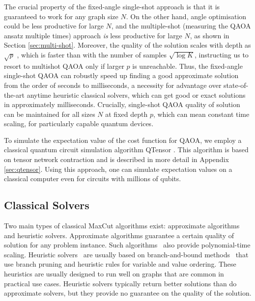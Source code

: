 \documentclass[prb,reprint,nofootinbib,longbibliography,superscriptaddress]{revtex4-1}
\begin{document}
The crucial property of the fixed-angle single-shot approach is that it is guaranteed to work for any graph size $N$.
On the other hand, angle optimisation could be less productive for large $N$, and the multiple-shot (measuring the QAOA ansatz multiple times) approach \textit{is} less productive for large $N$, as shown in Section \ref{sec:multi-shot}.
Moreover, the quality of the solution scales with depth as $\sqrt p$ \cite{wurtz2021fixed}, which is faster than with the number of samples $\sqrt{\log K}$, instructing us to resort to multishot QAOA only if larger $p$ is unreachable.
Thus, the fixed-angle single-shot QAOA can robustly speed up finding a good approximate solution from the order of seconds to milliseconds, a necessity for advantage over state-of-the-art anytime heuristic classical solvers, which can get good or exact solutions in approximately milliseconds. Crucially, single-shot QAOA quality of solution can be maintained for all sizes $N$ at fixed depth $p$, which can mean constant time scaling, for particularly capable quantum devices.



To simulate the expectation value of the cost function for 
QAOA, we employ a classical quantum circuit simulation algorithm QTensor \cite{lykov2021large, lykov_diagonal, LykovGPU}.
This algorithm is based on tensor network contraction and is described in more detail in Appendix \ref{sec:qtensor}.
Using this approach, one can simulate expectation values on a classical computer even for circuits with millions of qubits. 



\subsection{Classical Solvers}
\label{sec:meth_classical}


Two main types of classical MaxCut algorithms exist: approximate algorithms and heuristic solvers.
Approximate algorithms guarantee a certain quality of solution for any problem instance. Such algorithms~\cite{Halperin_MaxCut,gw-algo} 
also provide polynomial-time scaling.
Heuristic solvers~\cite{gurobi, MQLib} are usually based on branch-and-bound methods~\cite{gurobi_mip} that use branch pruning and heuristic rules for  variable and value ordering. These heuristics are usually 
designed to run well on graphs that are common in practical use cases.
Heuristic solvers typically return better solutions than do approximate solvers,
but they provide no guarantee on the quality of the solution.
\end{document}
